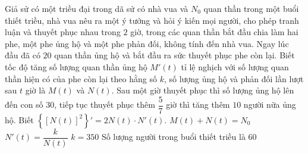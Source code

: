 \begin{ex}%
	Giả sử có một triều đại trong dã sử có nhà vua và $N_0$ quan thần trong một buổi thiết triều, nhà vua nêu ra một ý tưởng và hỏi ý kiến mọi người, cho phép tranh luận và thuyết phục nhau trong $2$ giờ, trong các quan thần bắt đầu chia làm hai phe, một phe ủng hộ và một phe phản đối, không tính đến nhà vua. Ngay lúc đầu đã có $20$ quan thần ủng hộ và bắt đầu ra sức thuyết phục phe còn lại. Biết tốc độ tăng số lượng quan thần ủng hộ $M'(t)$ tỉ lệ nghịch với số lượng quan thần hiện có của phe còn lại theo hằng số $k$, số lượng ủng hộ và phản đối lần lượt sau $t$ giờ là $M(t)$ và $N(t)$. Sau một giờ thuyết phục thì số lượng ủng hộ lên đến con số $30$, tiếp tục thuyết phục thêm $\dfrac{5}{7}$ giờ thì tăng thêm $10$ người nữa ủng hộ. Biết $\left\{[N(t)]^2\right\}' = 2N(t) \cdot N'(t)$.
	\choiceTF
	{\True $M(t) + N(t) = N_0$}
	{$N'(t) = \dfrac{k}{N(t)}$}
	{\True $k = 350$}
	{Số lượng người trong buổi thiết triều là $60$}
\end{ex}
